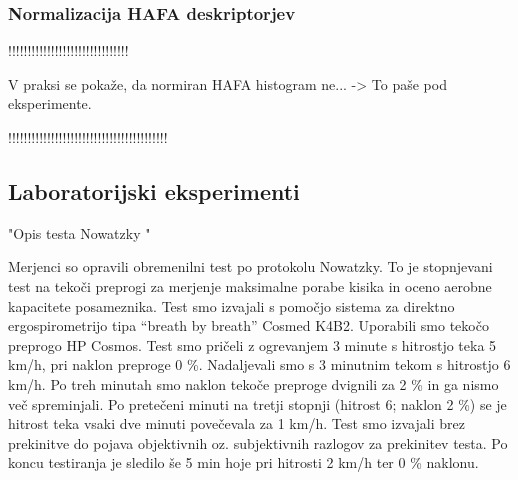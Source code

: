 \subsubsection{Normalizacija HAFA deskriptorjev}
!!!!!!!!!!!!!!!!!!!!!!!!!!!!!!!

V praksi se pokaže, da normiran HAFA histogram ne... -> To paše pod eksperimente.

!!!!!!!!!!!!!!!!!!!!!!!!!!!!!!!!!!!!!!!!!


\subsection{Laboratorijski eksperimenti}
"Opis testa Nowatzky "

Merjenci  so opravili obremenilni test po protokolu Nowatzky. To je stopnjevani test na tekoči preprogi za merjenje maksimalne porabe kisika in oceno aerobne kapacitete  posameznika. Test smo izvajali s pomočjo sistema za direktno ergospirometrijo tipa ``breath  by breath'' Cosmed K4B2. Uporabili smo  tekočo  preprogo HP Cosmos. Test smo pričeli z ogrevanjem 3 minute s hitrostjo teka 5 km/h, pri naklon preproge 0 \%. Nadaljevali smo s 3 minutnim tekom s hitrostjo 6 km/h. Po treh minutah smo naklon tekoče preproge  dvignili za 2 \% in ga nismo več spreminjali. Po pretečeni minuti na  tretji stopnji (hitrost 6; naklon 2 \%) se je hitrost teka vsaki dve  minuti  povečevala za 1 km/h. Test smo izvajali brez prekinitve do pojava objektivnih oz. subjektivnih razlogov za prekinitev testa. Po koncu testiranja je sledilo še 5 min hoje pri  hitrosti 2 km/h ter 0 \% naklonu.  

